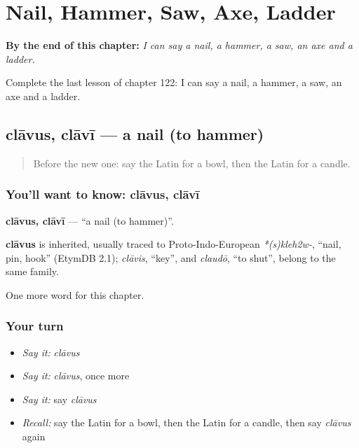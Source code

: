 
\chapter{Nail, Hammer, Saw, Axe, Ladder}
\label{ch:la-nail-hammer-saw-axe-ladder}

\begin{chapteropening}
\textbf{By the end of this chapter:} \emph{I can say a nail, a hammer, a saw, an axe and a ladder.}

Complete the last lesson of chapter 122: I can say a nail, a hammer, a saw, an axe and a ladder.
\end{chapteropening}

\section[clāvus, clāvī]{clāvus, clāvī — a nail (to hammer)}

\label{lesson:LA-C122-clavus}



\begin{quote}
Before the new one: say the Latin for a bowl, then the Latin for a candle.
\end{quote}

\subsection*{You'll want to know: clāvus, clāvī}
\textbf{clāvus, clāvī} — \textquotedblleft{}a nail (to hammer)\textquotedblright{}.

\begin{cousinweb}
\textbf{clāvus} is inherited, usually traced to Proto-Indo-European \emph{*(s)kleh2w-}, \textquotedblleft{}nail, pin, hook\textquotedblright{} (EtymDB 2.1); \emph{clāvis}, \textquotedblleft{}key\textquotedblright{}, and \emph{claudō}, \textquotedblleft{}to shut\textquotedblright{}, belong to the same family.
\end{cousinweb}

\begin{grammarlens}[title={What you've built}]
One more word for this chapter.
\end{grammarlens}

\subsection*{Your turn}
\begin{itemize}
\raggedright
  \item \emph{Say it:} \emph{clāvus}
  \item \emph{Say it:} \emph{clāvus}, once more
  \item \emph{Say it:} say \emph{clāvus}
  \item \emph{Recall:} say the Latin for a bowl, then the Latin for a candle, then say \emph{clāvus} again
\end{itemize}

